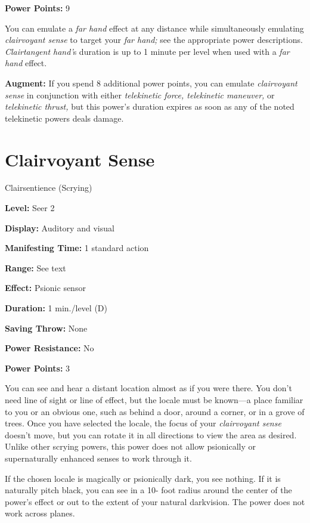 \documentclass{article}
\begin{document}
\textbf{Power Points:} 9

You can emulate a \textit{far hand }effect at any distance while simultaneously 
emulating \textit{clairvoyant sense }to target your \textit{far hand; }see the 
appropriate power descriptions. \textit{Clairtangent hand'}s duration is up to 
1 minute per level when used with a \textit{far hand }effect.

\textbf{Augment:} If you spend 8 additional power points, you can emulate \textit{clairvoyant 
sense }in conjunction with either \textit{telekinetic force, telekinetic maneuver, 
}or \textit{telekinetic thrust, }but this power's duration expires as soon as any 
of the noted telekinetic powers deals damage.

\vspace{12pt}
\section*{Clairvoyant Sense}

Clairsentience (Scrying)

\textbf{Level:} Seer 2

\textbf{Display:} Auditory and visual

\textbf{Manifesting Time:} 1 standard action

\textbf{Range:} See text

\textbf{Effect:} Psionic sensor

\textbf{Duration:} 1 min./level (D)

\textbf{Saving Throw:} None

\textbf{Power Resistance:} No

\textbf{Power Points:} 3

You can see and hear a distant location almost as if you were there. You don't 
need line of sight or line of effect, but the locale must be known---a place familiar 
to you or an obvious one, such as behind a door, around a corner, or in a grove 
of trees. Once you have selected the locale, the focus of your \textit{clairvoyant 
sense }doesn't move, but you can rotate it in all directions to view the area as 
desired. Unlike other scrying powers, this power does not allow psionically or 
supernaturally enhanced senses to work through it.

If the chosen locale is magically or psionically dark, you see nothing. If it is 
naturally pitch black, you can see in a 10- foot radius around the center of the 
power's effect or out to the extent of your natural darkvision. The power does 
not work across planes.
\end{document}
